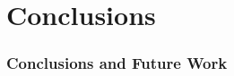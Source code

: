 \documentclass{beamer}
\begin{document}
\section{Conclusions}
\begin{frame}
    \frametitle{Conclusions and Future Work}
    \framesubtitle{}
\end{frame}
















%
%
%
%
\end{document}
